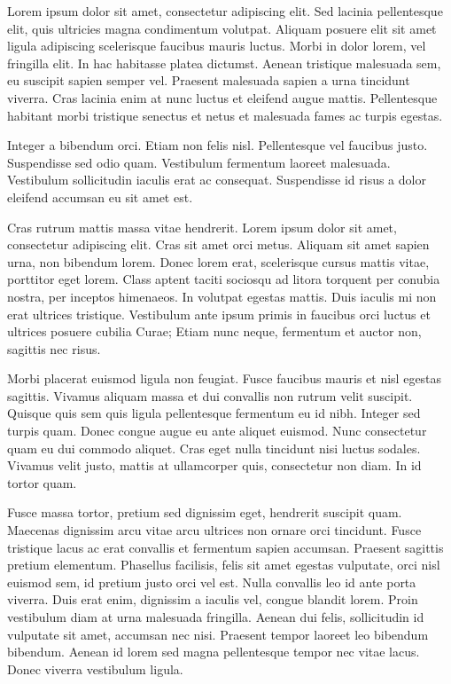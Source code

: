 \documentclass[12pt, a4paper]{article}
\title{\thetitle}
\author{\theauthor}
\date{\today}
\begin{document}
\maketitle
\thispagestyle{empty}

Lorem ipsum dolor sit amet, consectetur adipiscing elit. Sed lacinia
pellentesque elit, quis ultricies magna condimentum volutpat. Aliquam posuere
elit sit amet ligula adipiscing scelerisque faucibus mauris luctus. Morbi in
dolor lorem, vel fringilla elit. In hac habitasse platea dictumst. Aenean
tristique malesuada sem, eu suscipit sapien semper vel. Praesent malesuada
sapien a urna tincidunt viverra. Cras lacinia enim at nunc luctus et eleifend
augue mattis. Pellentesque habitant morbi tristique senectus et netus et
malesuada fames ac turpis egestas.

Integer a bibendum orci. Etiam non felis nisl. Pellentesque vel faucibus justo.
Suspendisse sed odio quam. Vestibulum fermentum laoreet malesuada. Vestibulum
sollicitudin iaculis erat ac consequat. Suspendisse id risus a dolor eleifend
accumsan eu sit amet est.

Cras rutrum mattis massa vitae hendrerit. Lorem ipsum dolor sit amet,
consectetur adipiscing elit. Cras sit amet orci metus. Aliquam sit amet sapien
urna, non bibendum lorem. Donec lorem erat, scelerisque cursus mattis vitae,
porttitor eget lorem. Class aptent taciti sociosqu ad litora torquent per
conubia nostra, per inceptos himenaeos. In volutpat egestas mattis. Duis
iaculis mi non erat ultrices tristique. Vestibulum ante ipsum primis in
faucibus orci luctus et ultrices posuere cubilia Curae; Etiam nunc neque,
fermentum et auctor non, sagittis nec risus.

Morbi placerat euismod ligula non feugiat. Fusce faucibus mauris et nisl
egestas sagittis. Vivamus aliquam massa et dui convallis non rutrum velit
suscipit. Quisque quis sem quis ligula pellentesque fermentum eu id nibh.
Integer sed turpis quam. Donec congue augue eu ante aliquet euismod. Nunc
consectetur quam eu dui commodo aliquet. Cras eget nulla tincidunt nisi luctus
sodales. Vivamus velit justo, mattis at ullamcorper quis, consectetur non diam.
In id tortor quam.

Fusce massa tortor, pretium sed dignissim eget, hendrerit suscipit quam.
Maecenas dignissim arcu vitae arcu ultrices non ornare orci tincidunt. Fusce
tristique lacus ac erat convallis et fermentum sapien accumsan. Praesent
sagittis pretium elementum. Phasellus facilisis, felis sit amet egestas
vulputate, orci nisl euismod sem, id pretium justo orci vel est. Nulla
convallis leo id ante porta viverra. Duis erat enim, dignissim a iaculis vel,
congue blandit lorem. Proin vestibulum diam at urna malesuada fringilla. Aenean
dui felis, sollicitudin id vulputate sit amet, accumsan nec nisi. Praesent
tempor laoreet leo bibendum bibendum. Aenean id lorem sed magna pellentesque
tempor nec vitae lacus. Donec viverra vestibulum ligula.
\end{document}
